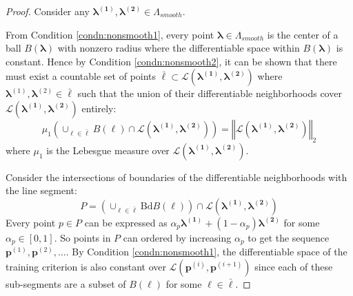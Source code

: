 \documentclass[12pt]{article}
\begin{document}
\begin{proof}
	Consider any $\boldsymbol{\lambda^{(1)}},\boldsymbol{\lambda^{(2)}}\in\Lambda_{smooth}$. 
	
	From Condition \ref{condn:nonsmooth1}, every point $\boldsymbol{\lambda} \in \Lambda_{smooth}$ is the center of a ball $B(\boldsymbol{\lambda})$ with nonzero radius where the differentiable space within $B(\boldsymbol{\lambda})$ is constant.
	Hence by Condition \ref{condn:nonsmooth2}, it can be shown that there must exist a countable
	set of points $\bar{\boldsymbol{\ell}} 
	\subset\mathcal{L}(\boldsymbol{\lambda^{(1)}},\boldsymbol{\lambda^{(2)}})$ where $\boldsymbol{\lambda}^{(1)}, \boldsymbol{\lambda}^{(2)} \in \bar{\boldsymbol{\ell}}$
	such that the union of their differentiable neighborhoods cover  $\mathcal{L}(\boldsymbol{\lambda^{(1)}},\boldsymbol{\lambda^{(2)}})$ entirely:
	\[
	\mu_{1}\left(\cup_{\ell \in \bar{\boldsymbol{\ell}}}B(\boldsymbol{\ell})
	\cap\mathcal{L}\left(\boldsymbol{\lambda^{(1)}},\boldsymbol{\lambda^{(2)}}\right)\right)=\left\Vert \mathcal{L}\left(\boldsymbol{\lambda^{(1)}},\boldsymbol{\lambda^{(2)}}\right)\right\Vert _{2}
	\]
	where $\mu_{1}$ is the Lebesgue measure over  $\mathcal{L}(\boldsymbol{\lambda^{(1)}},\boldsymbol{\lambda^{(2)}})$.
	
	Consider the intersections of boundaries of the differentiable neighborhoods with the line segment:
	\[
	P=
	\left ( 
	\cup_{\ell \in \bar{\boldsymbol{\ell}}}
	\mbox{Bd}B\left(\boldsymbol{\ell}\right)
	\right )
	\cap\mathcal{L}(\boldsymbol{\lambda^{(1)}},\boldsymbol{\lambda^{(2)}})
	\]
	Every point $p\in P$ can be expressed as $\alpha_{p}\boldsymbol{\lambda^{(1)}}+(1-\alpha_{p})\boldsymbol{\lambda^{(2)}}$
	for some $\alpha_{p}\in[0,1]$. So points in $P$ can ordered by increasing $\alpha_{p}$ to get the sequence $\boldsymbol{p}^{(1)}, \boldsymbol{p}^{(2)}, ... $.
	By Condition \ref{condn:nonsmooth1}, the differentiable space of the training criterion
	is also constant over $\mathcal{L}\left(\boldsymbol{p}^{(i)},\boldsymbol{p}^{(i+1)}\right)$ since each of these sub-segments are a subset of $B(\boldsymbol{\ell})$ for some $\boldsymbol{\ell} \in \bar{\boldsymbol{\ell}}$. 
	

\end{proof}
\end{document}
